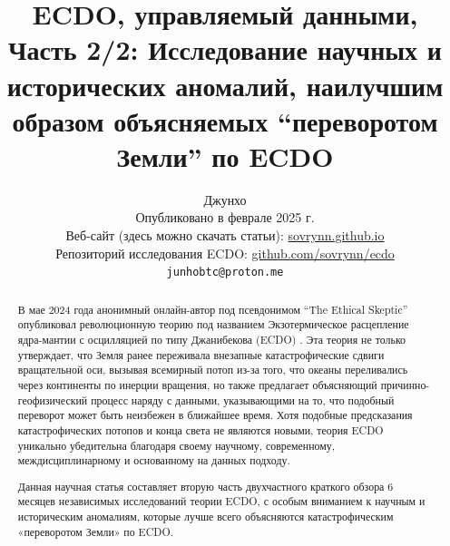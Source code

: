 \documentclass[10pt,twocolumn,letterpaper]{article}
\begin{document}
\title{ECDO, управляемый данными, Часть 2/2: Исследование научных и исторических аномалий, наилучшим образом объясняемых “переворотом Земли” по ECDO}

\author{Джунхо\\
Опубликовано в феврале 2025 г.\\
Веб-сайт (здесь можно скачать статьи): \href{https://sovrynn.github.io}{sovrynn.github.io}\\
Репозиторий исследования ECDO: \href{https://github.com/sovrynn/ecdo}{github.com/sovrynn/ecdo}\\
{\tt\small junhobtc@proton.me}
}

\maketitle

\begin{abstract}
В мае 2024 года анонимный онлайн-автор под псевдонимом “The Ethical Skeptic” \cite{0} опубликовал революционную теорию под названием Экзотермическое расцепление ядра-мантии с осцилляцией по типу Джанибекова (ECDO) \cite{1}. Эта теория не только утверждает, что Земля ранее переживала внезапные катастрофические сдвиги вращательной оси, вызывая всемирный потоп из-за того, что океаны переливались через континенты по инерции вращения, но также предлагает объясняющий причинно-геофизический процесс наряду с данными, указывающими на то, что подобный переворот может быть неизбежен в ближайшее время. Хотя подобные предсказания катастрофических потопов и конца света не являются новыми, теория ECDO уникально убедительна благодаря своему научному, современному, междисциплинарному и основанному на данных подходу.

Данная научная статья составляет вторую часть двухчастного краткого обзора 6 месяцев независимых исследований \cite{2,20} теории ECDO, с особым вниманием к научным и историческим аномалиям, которые лучше всего объясняются катастрофическим «переворотом Земли» по ECDO.

\end{abstract}
\end{document}

